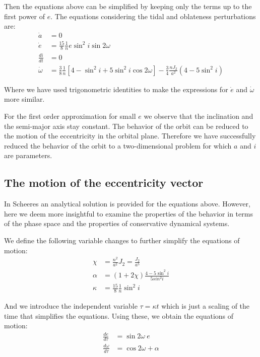 Then the equations above can be simplified by keeping only the terms up to the first power of $e$. The equations considering the tidal and oblateness perturbations are:
\begin{align}
\dot{a} &= 0\\
\dot{e} &= \frac{15}{8} \frac{1}{n} e \sin^2 i \sin 2\omega\\
\frac{di}{dt} &= 0\\
\dot{\omega} &= \frac{3}{8} \frac{1}{n}\left[4 - \sin^2 i+ 5 \sin^2 i \cos 2\omega \right] -\frac{3}{4} \frac{n J_2 }{a^2} \left(4 - 5 \sin^2 i\right)
\end{align}

Where we have used trigonometric identities to make the expressions for $\dot{e}$ and $\dot{\omega}$ more similar.

For the first order approximation for small $e$ we observe that the inclination and the semi-major axis stay constant. The behavior of the orbit can be reduced to the motion of the eccentricity in the orbital plane. Therefore we have successfully reduced the behavior of the orbit to a two-dimensional problem for which $a$ and $i$ are parameters.

\subsection{The motion of the eccentricity vector}
In Scheeres \cite{scheeres2001stability} an analytical solution is provided for the equations above. However, here we deem more insightful to examine the properties of the behavior in terms of the phase space and the properties of conservative dynamical systems.

We define the following variable changes to further simplify the equations of motion:
\begin{align}
\chi &= \frac{n^2}{a^2} J_2 = \frac{J_2}{a^5}  \\
\alpha &= (1+ 2\chi) \frac{4 - 5 \sin^2 i}{5 sin^2 i} \\
\kappa &= \frac{15}{8} \frac{1}{n} \sin^2 i
\end{align}

And we introduce the independent variable $\tau = \kappa t$ which is just a scaling of the time that simplifies the equations. Using these, we obtain the equations of motion:
\begin{align}
\frac{de}{d\tau} &= \sin 2\omega \ e \\
\label{domegadtau}
\frac{d\omega}{d\tau} &= \cos 2\omega+ \alpha
\end{align}


